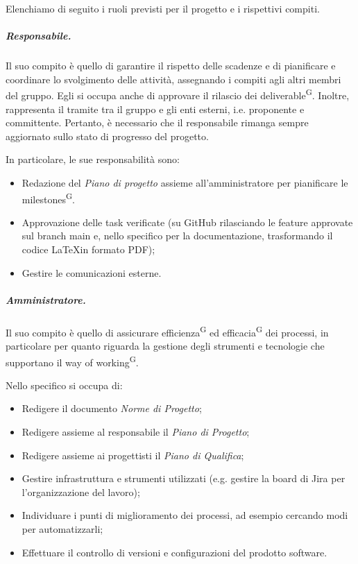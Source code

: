 \noindent Elenchiamo di seguito i ruoli previsti per il progetto e i rispettivi compiti.
\subparagraph{Responsabile.}
Il suo compito è quello di garantire il rispetto delle scadenze e di pianificare e coordinare lo svolgimento delle attività, assegnando i compiti agli altri membri del gruppo. Egli si occupa anche di approvare il rilascio dei deliverable\textsuperscript{G}.
Inoltre, rappresenta il tramite tra il gruppo e gli enti esterni, i.e. proponente e committente. Pertanto, è necessario che il responsabile rimanga sempre aggiornato sullo stato di progresso del progetto.

In particolare, le sue responsabilità sono:
\begin{itemize}
    \item Redazione del \textit{Piano di progetto} %
    assieme all'amministratore per pianificare le milestones\textsuperscript{G}.
    \item Approvazione delle task verificate (su GitHub rilasciando le feature approvate sul branch main e, nello specifico per la documentazione, trasformando il codice \LaTeX in formato PDF);
    \item Gestire le comunicazioni esterne.
\end{itemize}

\subparagraph{Amministratore.}
Il suo compito è quello di assicurare efficienza\textsuperscript{G} ed efficacia\textsuperscript{G} dei processi, in particolare per quanto riguarda la gestione degli strumenti e tecnologie che supportano il way of working\textsuperscript{G}.

Nello specifico si occupa di:
\begin{itemize}
    \item Redigere il documento \textit{Norme di Progetto};
    \item Redigere assieme al responsabile il \textit{Piano di Progetto};
    \item Redigere assieme ai progettisti il \textit{Piano di Qualifica};
    \item Gestire infrastruttura e strumenti utilizzati (e.g. gestire la board di Jira per l'organizzazione del lavoro);
    \item Individuare i punti di miglioramento dei processi, ad esempio cercando modi per automatizzarli;
    \item Effettuare il controllo di versioni e configurazioni del prodotto software.
\end{itemize}

